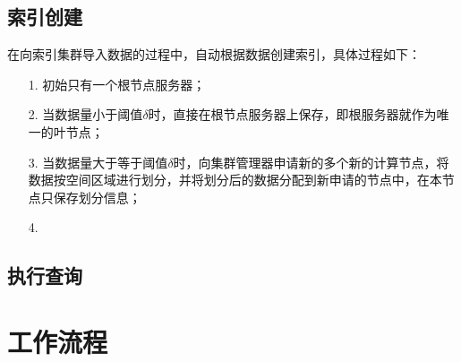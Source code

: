 \documentclass{elegantpaper}
\begin{document}
\subsection{索引创建}

在向索引集群导入数据的过程中，自动根据数据创建索引，具体过程如下：

\begin{itemize}
    
    \item[1.] 初始只有一个根节点服务器；
    
    \item[2.] 当数据量小于阈值$\delta$时，直接在根节点服务器上保存，即根服务器就作为唯一的叶节点；
    
    \item[3.] 当数据量大于等于阈值$\delta$时，向集群管理器申请新的多个新的计算节点，将数据按空间区域进行划分，并将划分后的数据分配到新申请的节点中，在本节点只保存划分信息；
    
    \item[4.] 

\end{itemize}

\subsection{执行查询}



\section{工作流程}
\end{document}

